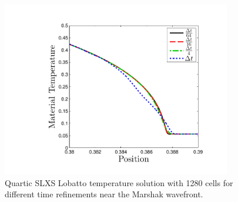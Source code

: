 %
%
\begin{figure}[!hbp]
\centering
\includegraphics[width=10cm,trim=1.0in  0.2in 0.5in 0.5in,clip=true]{chapter6_grey_radtran/Dissertation_Data/Time_Refinement_Zoom_Temperature.pdf}
\caption{Quartic SLXS Lobatto temperature solution with 1280 cells for different time refinements near the Marshak wavefront.}
\label{fig:time_refinement_temp}
\end{figure}

\pagebreak

